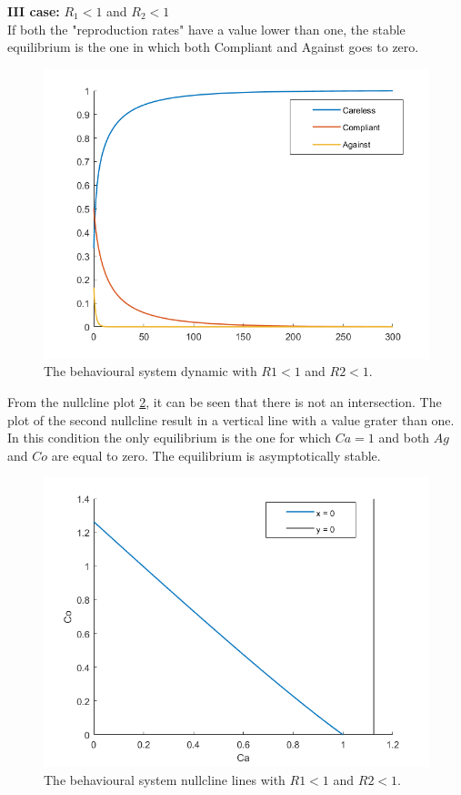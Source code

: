 \textbf{III case:} $R_1 <1$ and $R_2<1$ \\
If both the "reproduction rates" have a value lower than one, the stable equilibrium is the one in which both Compliant and Against goes to zero. 

\begin{figure}[h]
	\centering
	\includegraphics[width=0.7\linewidth]{1_corpo/figure/behavioural_equilibrium/r1r2less1_dyn}
	\caption[Behavioural third second case]{The behavioural system dynamic with $R1 < 1$ and $R2 < 1$.}
	\label{fig:r1r2less1dyn}
\end{figure}
From the nullcline plot \ref{fig:r1r2less1nullcline}, it can be seen that there is not an intersection. The plot of the second nullcline result in a vertical line with a value grater than one. In this condition the only equilibrium is the one for which $Ca = 1$ and both $Ag$ and $Co$ are equal to zero. 
The equilibrium is asymptotically stable. 
\begin{figure}[h]
	\centering
	\includegraphics[width=0.7\linewidth]{1_corpo/figure/behavioural_equilibrium/r1r2less1_nullcline}
	\caption[Behavioural nullcline third case]{The behavioural system nullcline lines with $R1 < 1$ and $R2 < 1$.}
	\label{fig:r1r2less1nullcline}
\end{figure}

